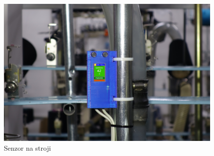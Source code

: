 \begin{figure}[htbp]
    \centering
    \includegraphics[width=\textwidth]{img/V2-uchyceni.png}
    \caption{Senzor na stroji}
    \label{fig:SenzorNaStroji}
\end{figure}


\newpage
